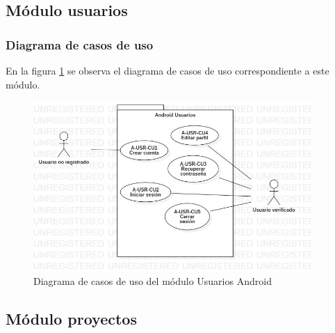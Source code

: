 \subsection{Módulo usuarios}
\subsubsection{Diagrama de casos de uso}
En la figura \ref{fig:modulo-usuarios-android} se observa el diagrama de casos de uso correspondiente a este módulo.
\begin{figure}[H]
    \centering
    \includegraphics[width=400px]{capitulo4/android/modulo-usuarios-android.jpg}
    \caption{Diagrama de casos de uso del módulo Usuarios Android}
    \label{fig:modulo-usuarios-android}
\end{figure}

\newpage

\newpage

\newpage

\newpage

\newpage
\subsection{Módulo proyectos}
